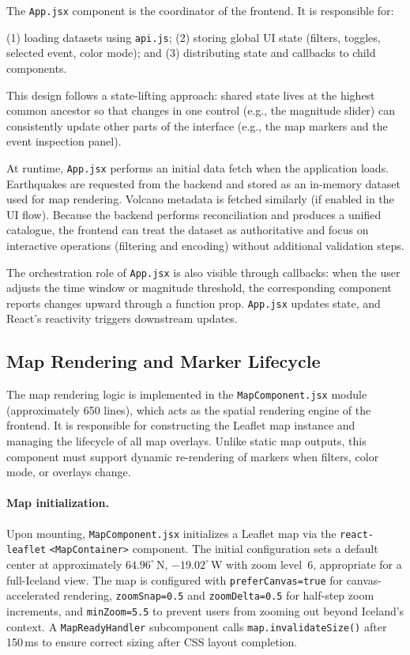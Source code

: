 \documentclass[12pt]{article}
\begin{document}
The \texttt{App.jsx} component is the coordinator of the frontend. It is responsible for:

(1) loading datasets using \texttt{api.js}; 
(2) storing global UI state (filters, toggles, selected event, color mode); 
and (3) distributing state and callbacks to child components.

This design follows a state-lifting approach: shared state lives at the highest common ancestor so that changes in one control (e.g., the magnitude slider) can consistently update other parts of the interface (e.g., the map markers and the event inspection panel).

At runtime, \texttt{App.jsx} performs an initial data fetch when the application loads. Earthquakes are requested from the backend and stored as an in-memory dataset used for map rendering. Volcano metadata is fetched similarly (if enabled in the UI flow). Because the backend performs reconciliation and produces a unified catalogue, the frontend can treat the dataset as authoritative and focus on interactive operations (filtering and encoding) without additional validation steps.

The orchestration role of \texttt{App.jsx} is also visible through callbacks: when the user adjusts the time window or magnitude threshold, the corresponding component reports changes upward through a function prop. \texttt{App.jsx} updates state, and React’s reactivity triggers downstream updates.

\subsection{Map Rendering and Marker Lifecycle}
\label{subsec:frontend_mapcomponent}

The map rendering logic is implemented in the \texttt{MapComponent.jsx} module (approximately 650 lines), which acts as the spatial rendering engine of the frontend. It is responsible for constructing the Leaflet map instance and managing the lifecycle of all map overlays. Unlike static map outputs, this component must support dynamic re-rendering of markers when filters, color mode, or overlays change.

\paragraph{Map initialization.}
Upon mounting, \texttt{MapComponent.jsx} initializes a Leaflet map via the \texttt{react-leaflet} \texttt{<MapContainer>} component. The initial configuration sets a default center at approximately $64.96^{\circ}$\,N, $-19.02^{\circ}$\,W with zoom level~6, appropriate for a full-Iceland view. The map is configured with \texttt{preferCanvas=true} for canvas-accelerated rendering, \texttt{zoomSnap=0.5} and \texttt{zoomDelta=0.5} for half-step zoom increments, and \texttt{minZoom=5.5} to prevent users from zooming out beyond Iceland's context. A \texttt{MapReadyHandler} subcomponent calls \texttt{map.invalidateSize()} after 150\,ms to ensure correct sizing after CSS layout completion.
\end{document}
